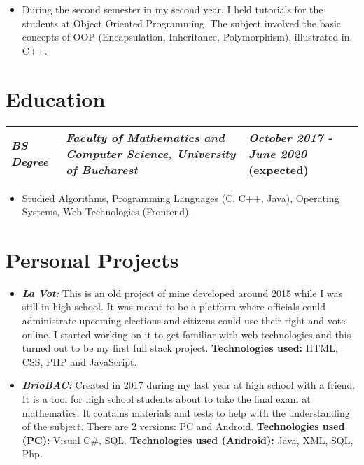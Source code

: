 \documentclass{article}
\begin{document}
        \begin{itemize}
            \item \footnotesize During the second semester in my second year, I held tutorials for the students at Object Oriented Programming. The subject involved the basic concepts of OOP (Encapsulation, Inheritance, Polymorphism), illustrated in C++.
        \end{itemize}

    \section*{Education}
        \begin{tabular} {lC{5cm}L{3cm}}
            \small\textit{\textbf{BS Degree}} 
            & \small\textit{\textbf{Faculty of Mathematics and Computer Science, University of Bucharest}} 
            & \small\textit{\textbf{October 2017 - June 2020}} (expected)\\
            \hline
        \end{tabular}

        \begin{itemize}
            \item \footnotesize Studied Algorithms, Programming Languages (C, C++, Java), Operating Systems, Web Technologies (Frontend).
        \end{itemize}

    \section*{Personal Projects}
        \begin{itemize}
            \item \footnotesize \textbf{\textit{La Vot:}} This is an old project of mine developed around 2015 while I was still in high school. It was meant to be a platform where officials could administrate upcoming elections and citizens could use their right and vote online. I started working on it to get familiar with web technologies and this turned out to be my first full stack project. \textbf{Technologies used:} HTML, CSS, PHP and JavaScript.
            \item \textbf{\textit{BrioBAC:}} Created in 2017 during my last year at high school with a friend. It is a tool for high school students about to take the final exam at mathematics. It contains materials and tests to help with the understanding of the subject. There are 2 versions: PC and Android. \textbf{Technologies used (PC):} Visual C\#, SQL. \textbf{Technologies used (Android):} Java, XML, SQL, Php.
        \end{itemize}
\end{document}

